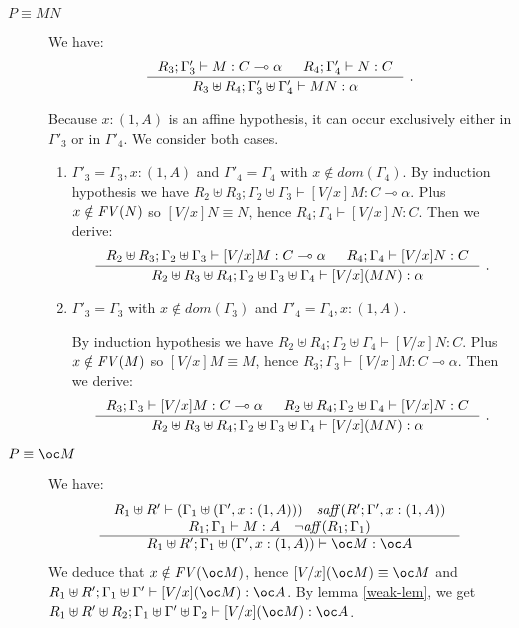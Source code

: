 \documentclass[11pt]{article}
\newcommand{\Gives}{\vdash}             \newcommand{\IGives}{\vdash_{I}}        \newcommand{\AIGives}{\vdash_{{\it AI}}} \newcommand{\CGives}{\vdash_{C}}
\newcommand{\hyp}[3]{#1:(#2, #3)}
\newcommand{\csum}{\uplus}              \newcommand{\dpar}{\mid\!\mid}
\newcommand{\infer}[2]{\begin{array}{c} #1 \\ \hline #2 \end{array}}
\begin{document}
  \begin{description}

  \item[$P \equiv MN$] We have:
    $$
    \inference
    {R_3;\Gamma'_3\vdash M:C\multimap \alpha & R_4;\Gamma'_4\vdash N:C}
    {R_3\uplus R_4;\Gamma'_3\uplus\Gamma'_4\vdash MN:\alpha}~.
    $$

Because $\hyp{x}{1}{A}$ is an affine hypothesis, it can occur 
exclusively either in $\Gamma'_3$ or in $\Gamma'_4$. We consider both cases.
    \begin{enumerate}

   \item $\Gamma'_3=\Gamma_3,x:(1,A)$ and $\Gamma'_4=\Gamma_4$ with $x
     \notin dom(\Gamma_4)$.
      By induction hypothesis we have $R_2\uplus R_3;\Gamma_2\uplus\Gamma_3\vdash [V/x]M:C\multimap \alpha$. Plus $x \notin {\it FV}(N)$ so $[V/x]N\equiv N$, hence $R_4;\Gamma_4\vdash [V/x]N:C$. Then we derive:
      $$
      \inference
      {R_2\uplus R_3;\Gamma_2\uplus\Gamma_3\vdash [V/x]M:C\multimap \alpha & R_4;\Gamma_4\vdash [V/x]N:C}
      {R_2\uplus R_3\uplus R_4;\Gamma_2\uplus\Gamma_3\uplus\Gamma_4\vdash [V/x](MN):\alpha}~.
      $$

\item $\Gamma'_3=\Gamma_3$ with $x \notin dom(\Gamma_3)$ and
  $\Gamma'_4=\Gamma_4,x:(1,A)$.

By induction hypothesis we have $R_2 \uplus
R_4;\Gamma_2\uplus\Gamma_4\vdash [V/x]N:C$. Plus $x \notin {\it FV}(M)$
so $[V/x]M\equiv M$, hence $R_3;\Gamma_3\vdash [V/x]M:C\multimap
\alpha$. Then we derive:
      $$
      \inference
      {R_3;\Gamma_3\vdash [V/x]M:C\multimap \alpha & R_2\uplus R_4;\Gamma_2\uplus\Gamma_4\vdash [V/x]N:C}
      {R_2\uplus R_3\uplus R_4;\Gamma_2\uplus\Gamma_3\uplus\Gamma_4\vdash [V/x](MN):\alpha}~.
      $$
    \end{enumerate}


    \item[$P\equiv\oc M$] We have:
      $$
      \infer{
        \begin{array}{c}
          R_1\uplus R'\Gives (\Gamma_1\csum (\Gamma',x:(1,A))) \quad \w{saff}(R';\Gamma',x:(1,A))\\
          R_1;\Gamma_1 \Gives M:A \quad \neg \w{aff}(R_1;\Gamma_1)
        \end{array}}
      {R_1\uplus R';\Gamma_1 \csum (\Gamma',x:(1,A)) \Gives \bang M:\bang A}
      $$
      We deduce that $x \notin \w{FV}(\oc M)$, hence $[V/x](\oc M)
      \equiv \oc M$ and $R_1\uplus R';\Gamma_1\csum\Gamma'\vdash
      [V/x](\oc M):\oc A$. By lemma \ref{weak-lem}, we get $R_1\uplus
      R'\uplus R_2;\Gamma_1\uplus\Gamma'\csum\Gamma_2\vdash [V/x](\oc
      M):\oc A$. \\



\end{description}
\end{document}

